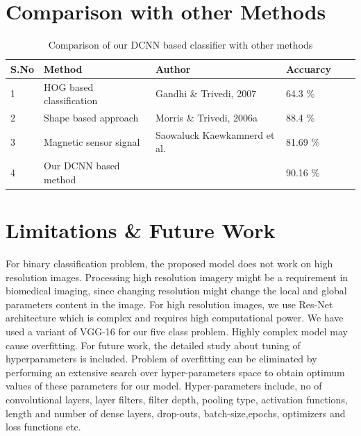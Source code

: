 \section{Comparison with other Methods}
\begin{table}[H]
    \caption{Comparison of our DCNN based classifier with other methods}
    \label{table:4.3}
	  \begin{center}
		\scalebox{1.05}
		{\begin{tabular}{|l |l |l |l |l |l |}
		\hline
		S.No & Method & Author & Accuarcy \\ \hline
		1  & HOG based classification & Gandhi \& Trivedi, 2007 & 64.3 \%
		\\ \hline
		2  & Shape based approach & Morris \& Trivedi, 2006a & 88.4 \% 
        \\ \hline %
        3   & Magnetic sensor signal &  Saowaluck Kaewkamnerd et al. & 81.69 \% 
        \\ \hline %
        4   & Our DCNN based method &   & 90.16 \%
        \\ \hline %
		\end{tabular}}
	  \end{center}
\end{table}

\section{Limitations \& Future Work}

For binary classification problem, the proposed model does not work on high resolution images.
Processing high resolution imagery might be a requirement in biomedical imaging,
since changing resolution might change the
local and global parameters content in the image. For high resolution images, we use Res-Net architecture which is complex and
requires high computational power. We have used a variant of VGG-16 for
our five class problem. Highly complex model may cause overfitting.
For future work, the detailed study
about tuning of hyperparameters is included.
Problem of overfitting can be eliminated by performing an
extensive search over hyper-parameters space to obtain optimum 
values of these parameters for our model.
Hyper-parameters include, no of convolutional layers, layer filters,
filter depth, pooling type, activation functions, length and number
of dense layers, drop-outs, batch-size,epochs, optimizers and loss
functions etc.
